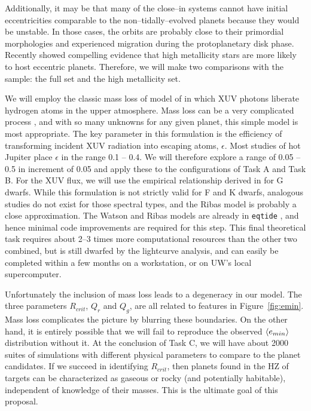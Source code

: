 Additionally, it may be that many of the close--in systems cannot
have initial eccentricities comparable to the non--tidally--evolved
planets because they would be unstable.  In those cases, the orbits
are probably close to their primordial morphologies and experienced
migration during the protoplanetary disk phase.  Recently
\cite{DawsonMurrayClay13} showed compelling evidence that high
metallicity stars are more likely to host eccentric planets.
Therefore, we will make two comparisons with the \kepler sample: the
full set and the high metallicity set.

\medskip
{\centerline{}}
\smallskip

We will employ the classic mass loss of model of \cite{Watson81} in
which XUV photons liberate hydrogen atoms in the upper atmosphere.
Mass loss can be a very complicated process
\citep{Yelle04,Lammer07,Khodachenko07,Leitzinger11,Lammer13}, and with
so many unknowns for any given planet, this simple model is most
appropriate.  The key parameter in this formulation is the efficiency
of transforming incident XUV radiation into escaping atoms,
$\epsilon$.  Most studies of hot Jupiter place $\epsilon$ in the range
0.1 -- 0.4.  We will therefore explore a range of 0.05 -- 0.5 in
increment of 0.05 and apply these to the configurations of Task A and
Task B.  For the XUV flux, we will use the empirical relationship
derived in \cite{Ribas05} for G dwarfs.  While this formulation is not
strictly valid for F and K dwarfs, analogous studies do not exist for
those spectral types, and the Ribas model is probably a close
approximation.  The Watson and Ribas models are already in
\texttt{eqtide} \citep{Barnes13}, and hence minimal code improvements
are required for this step.  This final theoretical task requires
about 2--3 times more computational resources than the other two
combined, but is still dwarfed by the \kepler lightcurve analysis, and
can easily be completed within a few months on a workstation, or on
UW's local supercomputer.

Unfortunately the inclusion of mass loss leads to a degeneracy in our
model.  The three parameters $R_{crit}$, $Q_r$ and $Q_g$, are all
related to features in Figure~\ref{fig:emin}.  Mass loss complicates
the picture by blurring these boundaries.  On the other hand, it is
entirely possible that we will fail to reproduce the observed
$\left< e_{min} \right>$ distribution without it.  At the conclusion of Task C,
we will have about 2000 suites of simulations with different physical
parameters to compare to the
\kepler planet candidates.  If we succeed in identifying $R_{crit}$,
then planets found in the HZ of \kepler targets can be characterized
as gaseous or rocky (and potentially habitable), independent of
knowledge of their masses.  This is the ultimate goal of this
proposal.


